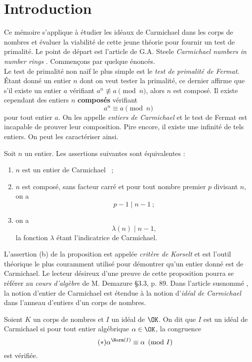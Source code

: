 \section*{Introduction}

Ce mémoire s'applique à étudier les idéaux de Carmichael dans les corps de nombres et évaluer la viabilité de cette jeune théorie pour fournir un test de primalité. Le point de départ est l'article de G.A. Steele \textit{Carmichael numbers in number rings} \cite{article}. Commençons par quelque énoncés. \\

Le test de primalité non naïf le plus simple est le \emph{test de primalité de Fermat}. Étant donné un entier $n$ dont on veut tester la primalité, ce dernier affirme que s'il existe un entier $a$ vérifiant $a^n \not \equiv a \pmod{n}$, alors $n$ est composé. Il existe cependant des entiers $n$ \textbf{composés} vérifiant $$a^n \equiv a\pmod{n}$$ pour tout entier $a$. On les appelle \emph{entiers de Carmichael} et le test de Fermat est incapable de prouver leur composition. Pire encore, il existe une infinité de tels entiers. On peut les caractériser ainsi.

\begin{proposition}\label{korselt} Soit $n$ un entier. Les assertions suivantes sont équivalentes :
	\begin{enumerate}[font=\normalshape]
		\item $n$ est un entier de Carmichael ~;
		\item $n$ est composé, sans facteur carré et pour tout nombre premier $p$ divisant $n$, on a $$p-1 \mid n-1 ~;$$
		\item on a $$ \lambda(n) \mid n-1 ,$$ la fonction $\lambda$ étant l'indicatrice de Carmichael.
	\end{enumerate}
\end{proposition}

L'assertion (b) de la proposition est appelée \textit{critère de Korselt} et est l'outil théorique le plus couramment utilisé pour démontrer qu'un entier donné est de Carmichael. Le lecteur désireux d'une preuve de cette proposition pourra se référer au \textit{cours d'algèbre} de M. Demazure \cite{Demazure} §3.3, p. 89. Dans l'article susnommé \cite{article}, la notion d'entier de Carmichael est étendue à la notion d'\emph{idéal de Carmichael} dans l'anneau d'entiers d'un corps de nombres.

\begin{definition} Soient $K$ un corps de nombres et $I$ un idéal de $\OK$. On dit que $I$ est un idéal de Carmichael si pour tout entier algébrique $\alpha \in \OK$, la congruence
	\begin{equation}\label{congruence-Carmichael}\tag{$\ast$}
		\alpha^{\Norm(I)} \equiv \alpha \pmod{I}
	\end{equation}
est vérifiée.
\end{definition}

